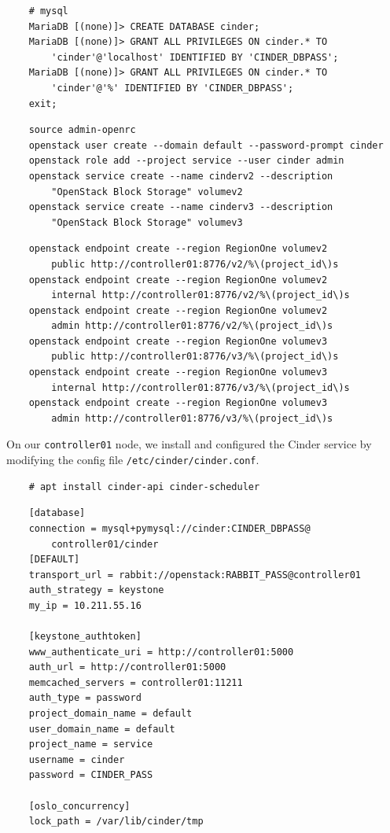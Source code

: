 \documentclass{article}
\begin{document}
\begin{verbatim}
    # mysql
    MariaDB [(none)]> CREATE DATABASE cinder;
    MariaDB [(none)]> GRANT ALL PRIVILEGES ON cinder.* TO 
        'cinder'@'localhost' IDENTIFIED BY 'CINDER_DBPASS';
    MariaDB [(none)]> GRANT ALL PRIVILEGES ON cinder.* TO 
        'cinder'@'%' IDENTIFIED BY 'CINDER_DBPASS';
    exit;
\end{verbatim}

\begin{verbatim}
    source admin-openrc
    openstack user create --domain default --password-prompt cinder
    openstack role add --project service --user cinder admin
    openstack service create --name cinderv2 --description 
        "OpenStack Block Storage" volumev2
    openstack service create --name cinderv3 --description 
        "OpenStack Block Storage" volumev3
\end{verbatim}

\begin{verbatim}
    openstack endpoint create --region RegionOne volumev2 
        public http://controller01:8776/v2/%\(project_id\)s
    openstack endpoint create --region RegionOne volumev2 
        internal http://controller01:8776/v2/%\(project_id\)s
    openstack endpoint create --region RegionOne volumev2 
        admin http://controller01:8776/v2/%\(project_id\)s
    openstack endpoint create --region RegionOne volumev3
        public http://controller01:8776/v3/%\(project_id\)s
    openstack endpoint create --region RegionOne volumev3
        internal http://controller01:8776/v3/%\(project_id\)s
    openstack endpoint create --region RegionOne volumev3
        admin http://controller01:8776/v3/%\(project_id\)s
\end{verbatim}

On our \texttt{controller01} node, we install and configured the Cinder service by modifying the config file \texttt{/etc/cinder/cinder.conf}.

\begin{verbatim}
    # apt install cinder-api cinder-scheduler
\end{verbatim}

\begin{verbatim}
    [database]
    connection = mysql+pymysql://cinder:CINDER_DBPASS@
        controller01/cinder
    [DEFAULT]
    transport_url = rabbit://openstack:RABBIT_PASS@controller01
    auth_strategy = keystone
    my_ip = 10.211.55.16

    [keystone_authtoken]
    www_authenticate_uri = http://controller01:5000
    auth_url = http://controller01:5000
    memcached_servers = controller01:11211
    auth_type = password
    project_domain_name = default
    user_domain_name = default
    project_name = service
    username = cinder
    password = CINDER_PASS

    [oslo_concurrency]
    lock_path = /var/lib/cinder/tmp
\end{verbatim}
\end{document}
